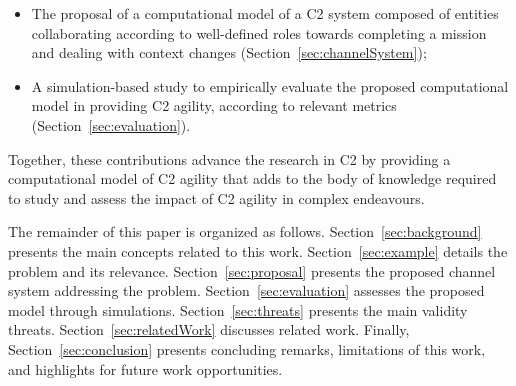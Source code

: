 \begin{itemize}

   

    
    
    
    \item \color{black}The proposal of a computational model of a C2 system composed of entities collaborating according to well-defined roles towards completing a mission and dealing with context changes (Section~\ref{sec:channelSystem});
    
    
    \item \color{black}A simulation-based study to empirically evaluate the proposed computational model in providing C2 agility, according to relevant metrics  (Section~\ref{sec:evaluation}).
\end{itemize}

\color{black}Together, these contributions advance the research in C2 by providing a computational model of C2 agility that adds to the body of knowledge required to study and assess the impact of C2 agility in complex endeavours.
\color{black}



The remainder of this paper is organized as follows. Section~\ref{sec:background}  presents the main concepts related to this work. Section~\ref{sec:example} details the problem and its relevance. Section~\ref{sec:proposal} presents the proposed channel system addressing the problem. Section~\ref{sec:evaluation} assesses the proposed model through simulations.  Section~\ref{sec:threats} presents the main validity threats. Section~\ref{sec:relatedWork} discusses related work. Finally, Section~\ref{sec:conclusion} presents   concluding remarks, limitations of this work, and highlights for future work opportunities.

